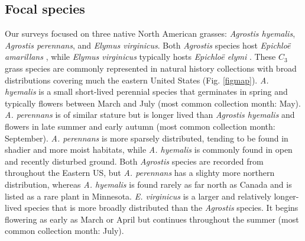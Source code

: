\documentclass[11pt]{article}
\let\cite\citep
\begin{document}
        \subsection*{Focal species}
Our surveys focused on three native North American grasses: \emph{Agrostis hyemalis}, \emph{Agrostis perennans}, and \emph{Elymus virginicus}. 
Both \emph{Agrostis} species host \emph{Epichloë amarillans} \cite{craven2001multigene, leuchtmann2014nomenclatural}, while \emph{Elymus virginicus} typically hosts \emph{Epichloë elymi} \cite{clay2002evolutionary}.
These $C_3$ grass species are commonly represented in natural history collections with broad distributions covering much the eastern United States (Fig. \ref{figmap}).
\emph{A. hyemalis} is a small short-lived perennial species that germinates in spring and typically flowers between March and July (most common collection month: May).
\emph{A. perennans} is of similar stature but is longer lived than \emph{Agrostis hyemalis} and flowers in late summer and early autumn (most common collection month: September). 
\emph{A. perennans} is more sparsely distributed, tending to be found in shadier and more moist habitats, while \emph{A. hyemalis} is commonly found in open and recently disturbed ground. 
Both \emph{Agrostis} species are recorded from throughout the Eastern US, but \emph{A. perennans} has a slighty more northern distribution, whereas \emph{A. hyemalis} is found rarely as far north as Canada and is listed as a rare plant in Minnesota.
\emph{E. virginicus} is a larger and relatively longer-lived  species that is more broadly distributed than the \emph{Agrostis} species. 
It begins flowering as early as March or April but continues throughout the summer (most common collection month: July).
\end{document}

